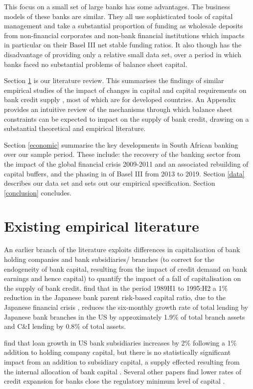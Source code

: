 \documentclass[
  12,
]{article}
\begin{document}
This focus on a small set of large banks has some advantages. The business models of these banks are similar. They all use sophisticated tools of capital management and take a substantial proportion of funding as wholesale deposits from non-financial corporates and non-bank financial institutions which impacts in particular on their Basel III net stable funding ratios. It also though has the disadvantage of providing only a relative small data set, over a period in which banks faced no substantial problems of balance sheet capital.

Section \ref{literature} is our literature review. This summarises the findings of similar empirical studies of the impact of changes in capital and capital requirements on bank credit supply , most of which are for developed countries. An Appendix provides an intuitive review of the mechanisms through which balance sheet constraints can be expected to impact on the supply of bank credit, drawing on a substantial theoretical and empirical literature.

Section \ref{economic} summarise the key developments in South African banking over our sample period. These include: the recovery of the banking sector from the impact of the global financial crisis 2009-2011 and an associated rebuilding of capital buffers, and the phasing in of Basel III from 2013 to 2019. Section \ref{data} describes our data set and sets out our empirical specification. Section \ref{conclusion} concludes.

\hypertarget{literature}{%
\section{Existing empirical literature}\label{literature}}

An earlier branch of the literature exploits differences in capitalisation of bank holding companies and bank subsidiaries/ branches (to correct for the endogeneity of bank capital, resulting from the impact of credit demand on bank earnings and hence capital) to quantify the impact of a fall of capitalisation on the supply of bank credit. \citet{peek1997international} find that in the period 1989H1 to 1995:H2 a 1\% reduction in the Japanese bank parent risk-based capital ratio, due to the Japanese financial crisis , reduces the six-monthly growth rate of total lending by Japanese bank branches in the US by approximately 1.9\% of total branch assets and C\&I lending by 0.8\% of total assets.

\citet{houston1997capital} find that loan growth in US bank subsidiaries increases by 2\% following a 1\% addition to holding company capital, but there is no statistically significant impact from an addition to subsidiary capital, a supply effected resulting from the internal allocation of bank capital \citep[ on losses in the 1930s]{calomiris2003fundamentals, calomiris1998bank}. Several other papers find lower rates of credit expansion for banks close the regulatory minimum level of capital \citep[see,][]{hancock1994bank, berger1994lines, nier2005bank, van2008welfare, gambacorta2004does, berrospide2010effects}.
\end{document}
